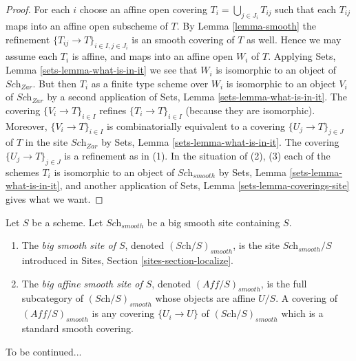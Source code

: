 \begin{proof}
For each $i$ choose an affine open covering $T_i = \bigcup_{j \in J_i} T_{ij}$
such that each $T_{ij}$ maps into an affine open subscheme of $T$. By
Lemma \ref{lemma-smooth}
the refinement $\{T_{ij} \to T\}_{i \in I, j \in J_i}$ is an smooth covering
of $T$ as well. Hence we may assume each $T_i$ is affine, and maps into
an affine open $W_i$ of $T$. Applying
Sets, Lemma \ref{sets-lemma-what-is-in-it}
we see that $W_i$ is isomorphic to an object of $\textit{Sch}_{Zar}$.
But then $T_i$ as a finite type scheme over $W_i$
is isomorphic to an object $V_i$ of $\textit{Sch}_{Zar}$ by a second
application of
Sets, Lemma \ref{sets-lemma-what-is-in-it}.
The covering $\{V_i \to T\}_{i \in I}$ refines $\{T_i \to T\}_{i \in I}$
(because they are isomorphic).
Moreover, $\{V_i \to T\}_{i \in I}$ is combinatorially equivalent to a
covering $\{U_j \to T\}_{j \in J}$ of $T$ in the site
$\textit{Sch}_{Zar}$ by
Sets, Lemma \ref{sets-lemma-what-is-in-it}.
The covering $\{U_j \to T\}_{j \in J}$ is a refinement as in (1).
In the situation of (2), (3) each of the
schemes $T_i$ is isomorphic to an object of $\textit{Sch}_{smooth}$ by
Sets, Lemma \ref{sets-lemma-what-is-in-it},
and another application of
Sets, Lemma \ref{sets-lemma-coverings-site}
gives what we want.
\end{proof}

\begin{definition}
\label{definition-big-small-smooth}
Let $S$ be a scheme. Let $\textit{Sch}_{smooth}$ be a big smooth
site containing $S$.
\begin{enumerate}
\item The {\it big smooth site of $S$}, denoted
$(\textit{Sch}/S)_{smooth}$, is the site $\textit{Sch}_{smooth}/S$
introduced in Sites, Section \ref{sites-section-localize}.
\item The {\it big affine smooth site of $S$}, denoted
$(\textit{Aff}/S)_{smooth}$, is the full subcategory of
$(\textit{Sch}/S)_{smooth}$ whose objects are affine $U/S$.
A covering of $(\textit{Aff}/S)_{smooth}$ is any covering
$\{U_i \to U\}$ of $(\textit{Sch}/S)_{smooth}$ which is a
standard smooth covering.
\end{enumerate}
\end{definition}

\noindent
To be continued...

